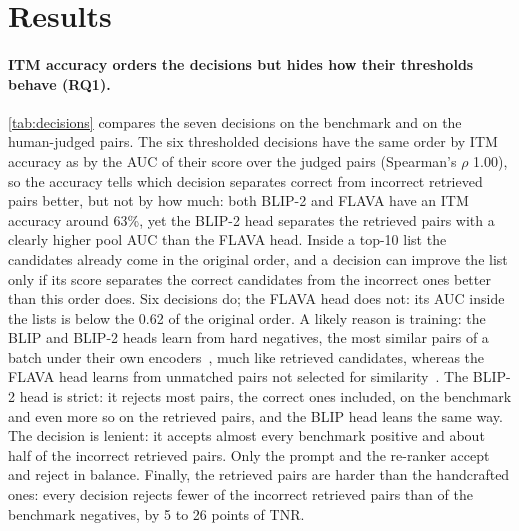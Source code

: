 \section{Results}
\label{sec:results}

\paragraph{ITM accuracy orders the decisions but hides how their thresholds behave (RQ1).}
\cref{tab:decisions} compares the seven decisions on the benchmark and on the human-judged pairs. The six thresholded decisions have the same order by ITM accuracy as by the AUC of their score over the judged pairs (Spearman's $\rho$ 1.00), so the accuracy tells which decision separates correct from incorrect retrieved pairs better, but not by how much: both BLIP-2 and FLAVA have an ITM accuracy around 63\%, yet the BLIP-2 head separates the retrieved pairs with a clearly higher pool AUC than the FLAVA head. Inside a top-10 list the candidates already come in the original order, and a decision can improve the list only if its score separates the correct candidates from the incorrect ones better than this order does. Six decisions do; the FLAVA head does not: its AUC inside the lists is below the 0.62 of the original order. A likely reason is training: the BLIP and BLIP-2 heads learn from hard negatives, the most similar pairs of a batch under their own encoders~\cite{li2022blip,li2023blip2}, much like retrieved candidates, whereas the FLAVA head learns from unmatched pairs not selected for similarity~\cite{singh2022flava}. The BLIP-2 head is strict: it rejects most pairs, the correct ones included, on the benchmark and even more so on the retrieved pairs, and the BLIP head leans the same way. The \qemb{} decision is lenient: it accepts almost every benchmark positive and about half of the incorrect retrieved pairs. Only the prompt and the re-ranker accept and reject in balance. Finally, the retrieved pairs are harder than the handcrafted ones: every decision rejects fewer of the incorrect retrieved pairs than of the benchmark negatives, by 5 to 26 points of TNR.

\begin{table}[t]
\centering
\caption{The seven decisions on \svo{}: ITM accuracy, TPR and TNR (\%) on the benchmark ($\dagger$: pairwise accuracy, no threshold); AUC of the score over the judged pairs and inside the top-10 lists (last row: the original order); TPR and TNR (\%) on the judged pairs (caption / image queries); share of the judged-incorrect pairs the default decision accepts, by the wrong role.}
\label{tab:decisions}
\footnotesize
\setlength{\tabcolsep}{4pt}
\resizebox{\linewidth}{!}{}
\end{table}

